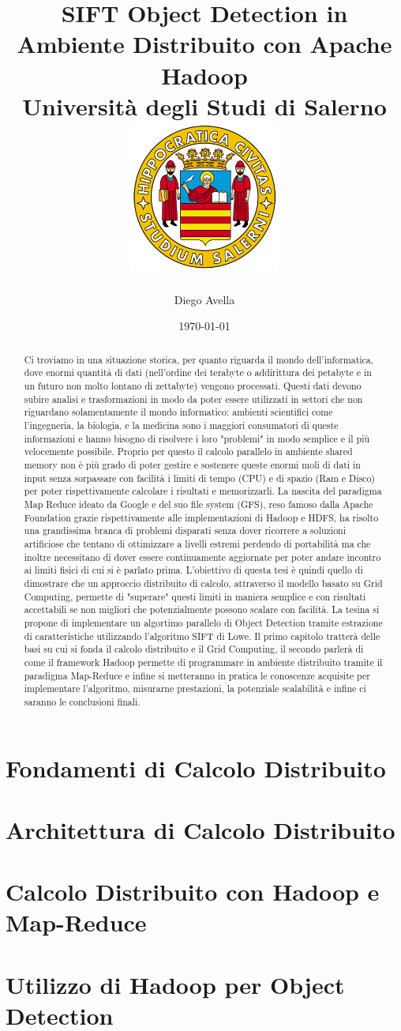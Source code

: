 \documentclass[12pt,a4paper,oneside]{report}
\title{
  {SIFT Object Detection in Ambiente Distribuito con Apache Hadoop}\\
  {\large Università degli Studi di Salerno}\\
  {\includegraphics[width=5cm, height=5cm]{logo_standard.png}}
}
\author{Diego Avella}
\date{\today}
\begin{document}
  \maketitle
  \begin{abstract}
    Ci troviamo in una situazione storica, per quanto riguarda il mondo dell'informatica, dove enormi quantità di dati (nell'ordine dei terabyte o addirittura dei petabyte e in un  futuro non molto lontano di zettabyte) vengono processati. Questi dati devono subire analisi e trasformazioni in modo da poter essere utilizzati in settori che non riguardano solamentamente il mondo informatico: ambienti scientifici come l'ingegneria, la biologia, e la medicina sono i maggiori consumatori di queste informazioni e hanno bisogno di risolvere i loro "problemi" in modo semplice e il più velocemente possibile. Proprio per questo il calcolo parallelo in ambiente shared memory non è più grado di poter gestire e sostenere queste enormi moli di dati in input senza sorpassare con facilità i limiti di tempo (CPU) e di spazio (Ram e Disco) per poter rispettivamente calcolare i risultati e memorizzarli. La nascita del paradigma Map Reduce ideato da Google e del suo file system (GFS), reso famoso dalla Apache Foundation grazie rispettivamente alle implementazioni di Hadoop e HDFS, ha risolto una grandissima branca di problemi disparati senza dover ricorrere a soluzioni artificiose che tentano di ottimizzare a livelli estremi perdendo di portabilità ma che inoltre necessitano di dover essere continuamente aggiornate per poter andare incontro ai limiti fisici di cui si è parlato prima. L'obiettivo di questa tesi è quindi quello di dimostrare che un approccio distribuito di calcolo, attraverso il modello basato su Grid Computing, permette di "superare" questi limiti in maniera semplice e con risultati accettabili se non migliori che potenzialmente possono scalare con facilità. La tesina si propone di implementare un algortimo parallelo di Object Detection tramite estrazione di caratteristiche utilizzando l'algoritmo SIFT di Lowe. Il primo capitolo tratterà delle basi su cui si fonda il calcolo distribuito e il Grid Computing, il secondo parlerà di come il framework Hadoop permette di programmare in ambiente distribuito tramite il paradigma Map-Reduce e infine si metteranno in pratica le conoscenze acquisite per implementare l'algoritmo, misurarne prestazioni, la potenziale scalabilità e infine ci saranno le conclusioni finali.
  \end{abstract}
  \tableofcontents
  \chapter{Fondamenti di Calcolo Distribuito}
  
  \chapter{Architettura di Calcolo Distribuito}
  
  \chapter{Calcolo Distribuito con Hadoop e Map-Reduce}
  
  \chapter{Utilizzo di Hadoop per Object Detection }
  
  
\end{document}
